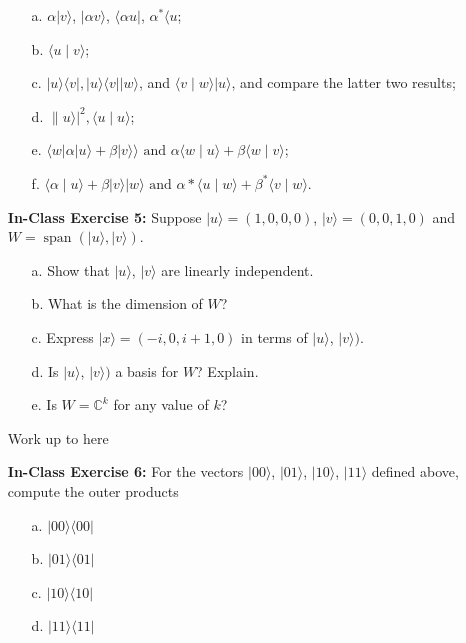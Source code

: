 \documentclass[main.tex]{subfiles}
\begin{document}
\begin{enumerate}
    \begin{enumerate}
        \item[a.] $\alpha|v\rangle$, $|\alpha v\rangle$, $\langle\alpha u|$, $\alpha^{*}\langle u$;
        \item[b.] $\langle u \mid v\rangle$;
        \item[c.] $|u\rangle\langle v|,| u\rangle\langle v|| w\rangle$, and $\langle v \mid w\rangle|u\rangle$, and compare the latter two results;
        \item[d.] $\| u\rangle\left.\right|^{2},\langle u \mid u\rangle$;
        \item[e.] $\langle w|\alpha| u\rangle+\beta|v\rangle\rangle \text { and } \alpha\langle w \mid u\rangle+\beta\langle w \mid v\rangle$;
        \item[f.] $\langle\alpha \mid u\rangle+\beta|v\rangle|w\rangle \text { and } \alpha *\langle u \mid w\rangle+\beta^{*}\langle v \mid w\rangle$.
    \end{enumerate}

\item[] \textbf{In-Class Exercise 5:} Suppose $|u\rangle=(1,0,0,0)$, $|v\rangle=(0,0,1,0)$ and $W=\operatorname{span}(|u\rangle,|v\rangle)$.

    \begin{enumerate}
        \item[a.] Show that $|u\rangle$, $|v\rangle$ are linearly independent.
        \item[b.] What is the dimension of $W$?
        \item[c.] Express $|x\rangle=(-i, 0, i+1,0)$ in terms of $|u\rangle$, $|v\rangle)$.
        \item[d.] Is $|u\rangle$, $|v\rangle)$ a basis for $W$? Explain.
        \item[e.] Is $W=\mathbb{C}^{k}$ for any value of $k$?
    \end{enumerate}
    
Work up to here

\item[] \textbf{In-Class Exercise 6:} For the vectors $|00\rangle$, $|01\rangle$, $|10\rangle$, $|11\rangle$ defined above, compute the outer products

    \begin{enumerate}
        \item[a.] $|00\rangle\langle 00|$
        \item[b.] $|01\rangle\langle 01|$
        \item[c.] $|10\rangle\langle 10|$
        \item[d.] $|11\rangle\langle 11|$
    \end{enumerate}


\end{enumerate}
\end{document}
